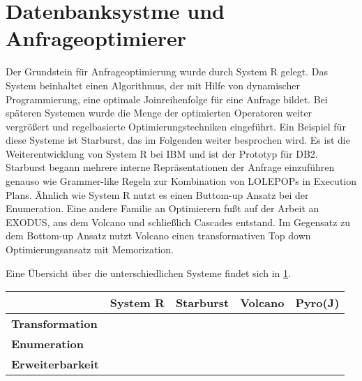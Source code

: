 








\section{Datenbanksystme und Anfrageoptimierer}

Der Grundstein für Anfrageoptimierung wurde durch System R gelegt. Das System beinhaltet einen Algorithmus, der mit Hilfe von dynamischer Programmierung, eine optimale Joinreihenfolge für eine Anfrage bildet. Bei späteren Systemen  wurde die Menge der optimierten Operatoren weiter vergrößert und regelbasierte Optimierungstechniken eingeführt. Ein Beispiel für diese Systeme ist Starburst, das im Folgenden weiter besprochen wird. Es ist die Weiterentwicklung von System R bei IBM und ist der Prototyp für DB2. Starburst begann mehrere interne Repräsentationen der Anfrage einzuführen genauso wie Grammer-like Regeln zur Kombination von LOLEPOPs in Execution Plans. Ähnlich wie System R nutzt es einen Buttom-up Ansatz bei der Enumeration. Eine andere Familie an Optimierern fußt auf der Arbeit an EXODUS, aus dem Volcano und schließlich Cascades entstand. Im Gegensatz zu dem Bottom-up Ansatz nutzt Volcano einen transformativen Top down Optimierungsansatz mit Memorization.


Eine Übersicht über die unterschiedlichen Systeme findet sich in \ref{DatabasesOverview}.
\begin{table}[h]
\begin{tabular}{|l|l|l|l|l|}
\hline
{\bf }                & {\bf System R} & {\bf Starburst} & {\bf Volcano} & {\bf Pyro(J)} \\ \hline
{\bf Transformation}  &                &                 &               &               \\ \hline
{\bf Enumeration}     &                &                 &               &               \\ \hline
{\bf Erweiterbarkeit} &                &                 &               &               \\ \hline
\end{tabular}
\label{DatabasesOverview}
\end{table}








